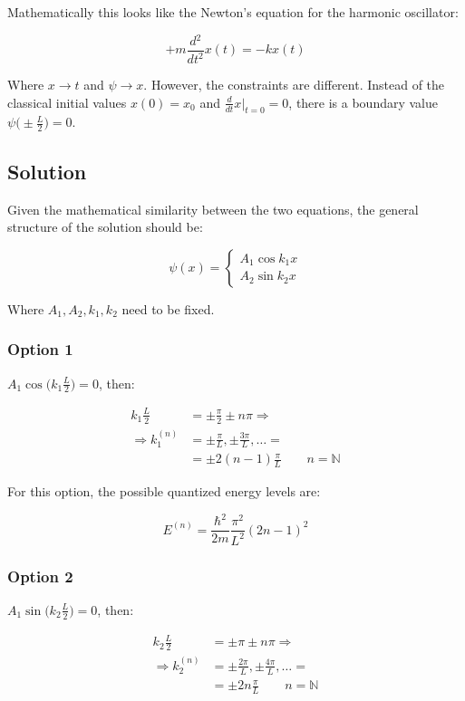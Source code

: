 Mathematically this looks like the Newton's equation for the harmonic oscillator:

$$+m \frac{d{^2}}{d{t^2}}x(t) = -kx(t)$$

Where $x\rightarrow t$ and $\psi\rightarrow x$.
However, the constraints are different. Instead of the classical initial values $x(0) = x_0$ and $\frac{d{}}{d{t}}x|_{t=0} = 0$, there is a boundary value $\psi\bigl(\pm \frac{L}{2}\bigr) = 0$.

  \subsection{Solution}
  Given the mathematical similarity between the two equations, the general structure of the solution should be:

  $$\psi(x) = \begin{cases}A_1\cos k_1 x \\A_2\sin k_2x\end{cases}$$

  Where $A_1,A_2,k_1, k_2$ need to be fixed.

    \subsubsection{Option 1}
    $A_1\cos\biggl(k_1 \frac{L}{2}\biggr) = 0$, then:

    \begin{align*}
      k_1 \frac{L}{2} &=\pm \frac{\pi}{2}\pm n\pi\Rightarrow\\
      \Rightarrow k_1^{(n)} &=\pm \frac{\pi}{L},\pm \frac{3\pi}{L},\dots =\\
                            &= \pm 2(n-1)\frac{\pi}{L}\qquad n = \mathbb{N}
    \end{align*}

    For this option, the possible quantized energy levels are:

    $$E^{(n)} = \frac{\hbar^2}{2m}\frac{\pi^2}{L^2}(2n-1)^2$$

    \subsubsection{Option 2}
    $A_1\sin\biggl(k_2 \frac{L}{2}\biggr) = 0$, then:

    \begin{align*}
      k_2 \frac{L}{2} &=\pm \pi\pm n\pi\Rightarrow\\
      \Rightarrow k_2^{(n)} &=\pm \frac{2\pi}{L},\pm \frac{4\pi}{L},\dots =\\
                            &= \pm 2n\frac{\pi}{L}\qquad n = \mathbb{N}
    \end{align*}


